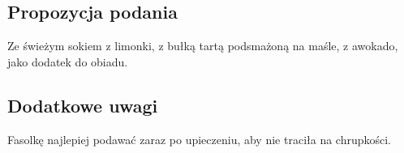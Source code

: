 \vspace{0.5cm}

\small
\subsection*{Propozycja podania}
Ze świeżym sokiem z limonki, z bułką tartą podsmażoną na maśle, z awokado, jako dodatek do obiadu.

\vspace{0.3cm}

\subsection*{Dodatkowe uwagi}
Fasolkę najlepiej podawać zaraz po upieczeniu, aby nie traciła na chrupkości.

\newpage

